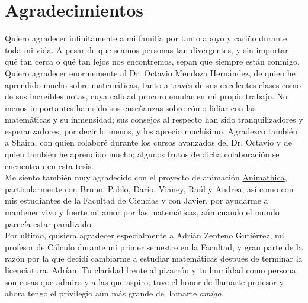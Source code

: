 \documentclass[tesis]{subfiles}
\begin{document}
\chapter*{Agradecimientos}\label{Chap: Agradecimientos}

Quiero agradecer infinitamente a mi familia por tanto apoyo y cariño durante toda mi vida. A pesar de que seamos personas tan divergentes, y sin importar qué tan cerca o qué tan lejos nos encontremos, sepan que siempre están conmigo. \\ %

Quiero agradecer enormemente al Dr. Octavio Mendoza Hernández, de quien he aprendido mucho sobre matemáticas, tanto a través de sus excelentes clases como de sus increíbles notas, cuya calidad procuro emular en mi propio trabajo. No menos importantes han sido sus enseñanzas sobre cómo lidiar con las matemáticas y su inmensidad; sus consejos al respecto han sido tranquilizadores y esperanzadores, por decir lo menos, y los aprecio muchísimo. Agradezco también a Shaira, con quien colaboré durante los cursos avanzados del Dr. Octavio y de quien también he aprendido mucho; algunos frutos de dicha colaboración se encuentran en esta tesis. \\

Me siento también muy agradecido con el proyecto de animación \href{https://www.youtube.com/playlist?list=PL91agCMqt_mdAgHZkxyn-tscoNpu7ZHvl}{Animathica}, particularmente con Bruno, Pablo, Darío, Vianey, Raúl y Andrea, así como con mis estudiantes de la Facultad de Ciencias y con Javier, por ayudarme a mantener vivo y fuerte mi amor por las matemáticas, aún cuando el mundo parecía estar paralizado. \\

Por último, quisiera agradecer especialmente a Adrián Zenteno Gutiérrez, mi profesor de Cálculo durante mi primer semestre en la Facultad, y gran parte de la razón por la que decidí cambiarme a estudiar matemáticas después de terminar la licenciatura. Adrían: Tu claridad frente al pizarrón y tu humildad como persona son cosas que admiro y a las que aspiro; tuve el honor de llamarte profesor y ahora tengo el privilegio aún más grande de llamarte \emph{amigo}.
\end{document}

